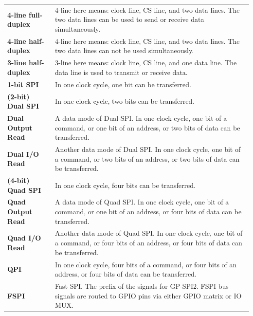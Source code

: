 \begin{longtable}[c]{ R{7cm} p{10cm} }
\textbf{4-line full-duplex} & 4-line here means: clock line, CS line, and two data lines. The two data lines can be used to send or receive data simultaneously.\\
\textbf{4-line half-duplex} & 4-line here means: clock line, CS line, and two data lines. The two data lines can not be used simultaneously.\\
\textbf{3-line half-duplex} & 3-line here means: clock line, CS line, and one data line. The data line is used to transmit or receive data. \\
\textbf{1-bit SPI} & In one clock cycle, one bit can be transferred.\\
\textbf{(2-bit) Dual SPI} & In one clock cycle, two bits can be transferred. \\
\textbf{Dual Output Read} & A data mode of Dual SPI. In one clock cycle, one bit of a command, or one bit of an address, or two bits of data can be transferred.\\
\textbf{Dual I/O Read} & Another data mode of Dual SPI. In one clock cycle, one bit of a command, or two bits of an address, or two bits of data can be transferred.\\
\textbf{(4-bit) Quad SPI} & In one clock cycle, four bits can be transferred. \\
\textbf{Quad Output Read} & A data mode of Quad SPI. In one clock cycle, one bit of a command, or one bit of an address, or four bits of data can be transferred.\\
\textbf{Quad I/O Read} & Another data mode of Quad SPI. In one clock cycle, one bit of a command, or four bits of an address, or four bits of data can be transferred.\\
\textbf{QPI} & In one clock cycle, four bits of a command, or four bits of an address, or four bits of data can be transferred.\\
\textbf{FSPI} & Fast SPI. The prefix of the signals for GP-SPI2. FSPI bus signals are routed to GPIO pins via either GPIO matrix or IO MUX.\\
\end{longtable}
